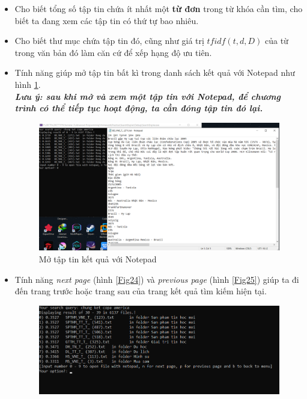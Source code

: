 \documentclass[12pt,a4paper]{article}
\begin{document}
\begin{itemize}
\item Cho biết tổng số tập tin chứa ít nhất một \textbf{từ đơn} trong từ khóa cần tìm, cho biết ta đang xem các tập tin có thứ tự bao nhiêu.
\item Cho biết thư mục chứa tập tin đó, cũng như giá trị \(tfidf\left( {t,d,D} \right)\) của từ trong văn bản đó làm căn cứ để xếp hạng độ ưu tiên.
\item Tính năng giúp mở tập tin bất kì trong danh sách kết quả với Notepad như hình \ref{Fig23}.\\
\textbf{\textit{Lưu ý: sau khi mở và xem một tập tin với Notepad, để chương trình có thể tiếp tục hoạt động, ta cần đóng tập tin đó lại.}}
\begin{figure}[H]
\begin{center}
\includegraphics[scale=0.5]{Fig23}
\end{center}
\caption{Mở tập tin kết quả với Notepad}
\label{Fig23}
\end{figure}
\item Tính năng \textit{next page} (hình \ref{Fig24}) và \textit{previous page} (hình \ref{Fig25}) giúp ta đi đến trang trước hoặc trang sau của trang kết quả tìm kiếm hiện tại.
\begin{figure}[H]
\begin{center}
\includegraphics[scale=0.9]{Fig24}
\end{center}

\end{figure}
\end{itemize}
\end{document}
